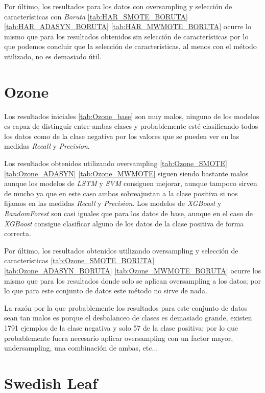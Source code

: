 Por último, los resultados para los datos con oversampling y selección de características con \textit{Boruta} \ref{tab:HAR_SMOTE_BORUTA} \ref{tab:HAR_ADASYN_BORUTA} \ref{tab:HAR_MWMOTE_BORUTA} ocurre lo mismo que para los resultados obtenidos sin selección de características por lo que podemos concluir que la selección de características, al menos con el método utilizado, no es demasiado útil.

\section{Ozone}

Los resultados iniciales \ref{tab:Ozone_base} son muy malos, ninguno de los modelos es capaz de distinguir entre ambas clases y probablemente esté clasificando todos los datos como de la clase negativa por los valores que se pueden ver en las medidas \textit{Recall} y \textit{Precision}.\newline

Los resultados obtenidos utilizando oversampling \ref{tab:Ozone_SMOTE} \ref{tab:Ozone_ADASYN} \ref{tab:Ozone_MWMOTE} siguen siendo bastante malos aunque los modelos de \textit{LSTM} y \textit{SVM} consiguen mejorar, aunque tampoco sirven de mucho ya que en este caso ambos sobreajustan a la clase positiva si nos fijamos en las medidas \textit{Recall} y \textit{Precision}. Los modelos de \textit{XGBoost} y \textit{RandomForest} son casi iguales que para los datos de base, aunque en el caso de \textit{XGBoost} consigue clasificar alguno de los datos de la clase positiva de forma correcta.\newline

Por último, los resultados obtenidos utilizando oversampling y selección de características \ref{tab:Ozone_SMOTE_BORUTA} \ref{tab:Ozone_ADASYN_BORUTA} \ref{tab:Ozone_MWMOTE_BORUTA} ocurre los mismo que para los resultados donde solo se aplican oversampling a los datos; por lo que para este conjunto de datos este método no sirve de nada.\newline

La razón por la que probablemente los resultados para este conjunto de datos sean tan malos es porque el desbalanceo de clases es demasiado grande, existen 1791 ejemplos de la clase negativa y solo 57 de la clase positiva; por lo que probablemente fuera necesario aplicar oversampling con un factor mayor, undersampling, una combinación de ambas, etc...

\section{Swedish Leaf}

